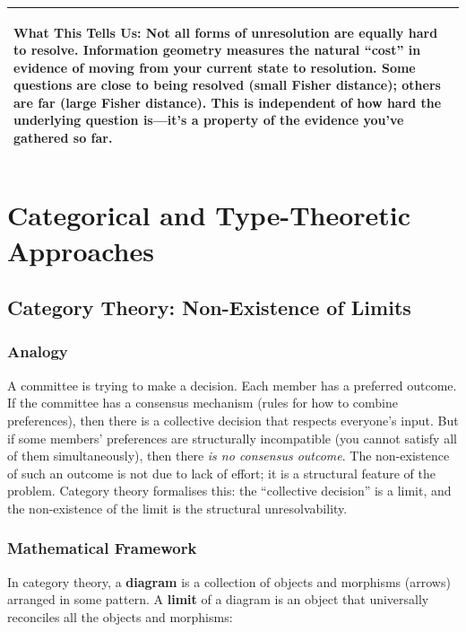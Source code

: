 \documentclass[11pt,letterpaper]{article}
\theoremstyle{definition}
\theoremstyle{remark}
\newenvironment{insightbox}{%
  \vspace{0.3cm}%
  \noindent\begin{tabular}{|p{\dimexpr\textwidth-4\tabcolsep-2\arrayrulewidth}|}
  \hline
  \small\itshape\color{accent}
}{%
  \\ \hline
  \end{tabular}
  \vspace{0.3cm}
}
\begin{document}
\begin{insightbox}
\textbf{What This Tells Us:} Not all forms of unresolution are equally hard to resolve. Information geometry measures the natural ``cost'' in evidence of moving from your current state to resolution. Some questions are close to being resolved (small Fisher distance); others are far (large Fisher distance). This is independent of how hard the underlying question is---it's a property of the evidence you've gathered so far.
\end{insightbox}

\newpage

\section{Categorical and Type-Theoretic Approaches}
\label{sec:categorical}

\subsection{Category Theory: Non-Existence of Limits}

\subsubsection*{Analogy}

A committee is trying to make a decision. Each member has a preferred outcome. If the committee has a consensus mechanism (rules for how to combine preferences), then there is a collective decision that respects everyone's input. But if some members' preferences are structurally incompatible (you cannot satisfy all of them simultaneously), then there \emph{is no consensus outcome}. The non-existence of such an outcome is not due to lack of effort; it is a structural feature of the problem. Category theory formalises this: the ``collective decision'' is a limit, and the non-existence of the limit is the structural unresolvability.

\subsubsection*{Mathematical Framework}

In category theory, a \textbf{diagram} is a collection of objects and morphisms (arrows) arranged in some pattern. A \textbf{limit} of a diagram is an object that universally reconciles all the objects and morphisms:
\end{document}
